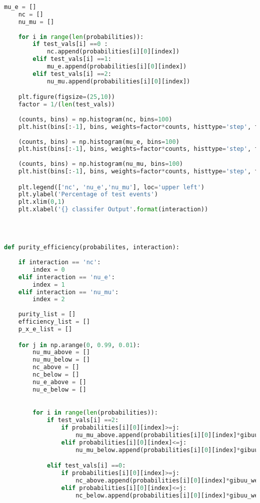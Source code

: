\begin{lstlisting}[language=Python]
    mu_e = []
    nc = []
    nu_mu = []
    
    for i in range(len(probabilities)):
        if test_vals[i] ==0 :
            nc.append(probabilities[i][0][index])
        elif test_vals[i] ==1:
            mu_e.append(probabilities[i][0][index])
        elif test_vals[i] ==2:
            nu_mu.append(probabilities[i][0][index])

    plt.figure(figsize=(25,10))
    factor = 1/(len(test_vals))
    
    (counts, bins) = np.histogram(nc, bins=100)
    plt.hist(bins[:-1], bins, weights=factor*counts, histtype='step', fill=False, linestyle=('solid'),color=('b'))
    
    (counts, bins) = np.histogram(mu_e, bins=100)
    plt.hist(bins[:-1], bins, weights=factor*counts, histtype='step', fill=False, linestyle=('solid'),color=('orange'))
    
    (counts, bins) = np.histogram(nu_mu, bins=100)
    plt.hist(bins[:-1], bins, weights=factor*counts, histtype='step', fill=False, linestyle=('solid'),color=('g'))

    plt.legend(['nc', 'nu_e','nu_mu'], loc='upper left')
    plt.ylabel('Percentage of test events')
    plt.xlim(0,1)
    plt.xlabel('{} classifer Output'.format(interaction))
    
    
    

def purity_efficiency(probabilites, interaction):
    
    if interaction == 'nc':
        index = 0
    elif interaction == 'nu_e':
        index = 1
    elif interaction == 'nu_mu':
        index = 2
    
    purity_list = []
    efficiency_list = []
    p_x_e_list = []

    for j in np.arange(0, 0.99, 0.01):
        nu_mu_above = []
        nu_mu_below = []
        nc_above = []
        nc_below = []
        nu_e_above = []
        nu_e_below = []
        

        for i in range(len(probabilities)):
            if test_vals[i] ==2:
                if probabilities[i][0][index]>=j:
                    nu_mu_above.append(probabilities[i][0][index]*gibuu_weights[i])
                elif probabilities[i][0][index]<=j:
                    nu_mu_below.append(probabilities[i][0][index]*gibuu_weights[i])

            elif test_vals[i] ==0:         
                if probabilities[i][0][index]>=j:
                    nc_above.append(probabilities[i][0][index]*gibuu_weights[i])
                elif probabilities[i][0][index]<=j:
                    nc_below.append(probabilities[i][0][index]*gibuu_weights[i])


\end{lstlisting}

